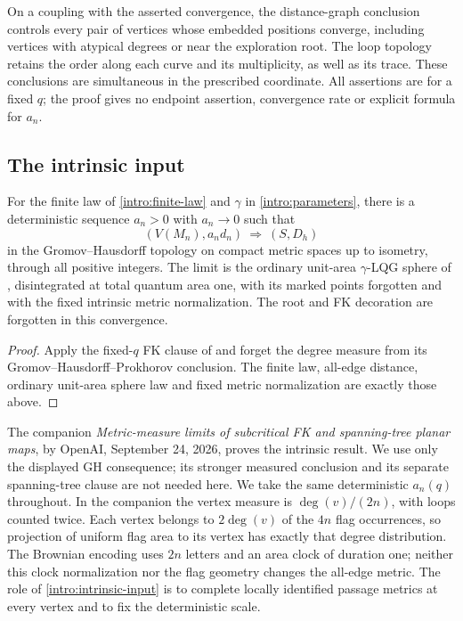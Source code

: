 On a coupling with the asserted convergence, the distance-graph conclusion
controls every pair of vertices whose embedded positions converge,
including vertices with atypical degrees
or near the exploration root. The loop topology retains the order along
each curve and its multiplicity, as well as its trace. These conclusions
are simultaneous in the prescribed coordinate. All assertions are for
a fixed $q$; the proof gives no endpoint assertion, convergence rate
or explicit formula for $a_n$.

\subsection{The intrinsic input}

\begin{theorem}
\label{intro:intrinsic-input}
For the finite law of \cref{intro:finite-law} and $\gamma$ in
\eqref{intro:parameters}, there is a deterministic sequence $a_n>0$
with $a_n\to0$ such that
\[
 (V(M_n),a_n d_n)\ \Longrightarrow\ (S,D_h)
\]
in the Gromov--Hausdorff topology on compact metric spaces up to
isometry, through all positive integers. The limit is the ordinary
unit-area $\gamma$-LQG sphere of \citet[Definition~4.21(ii)]{DMSMating},
disintegrated at total quantum area one, with its marked points
forgotten and with the fixed intrinsic metric normalization. The root
and FK decoration are forgotten in this convergence.
\end{theorem}

\begin{proof}
Apply the fixed-$q$ FK clause of \citet[Theorem~1.1]{Intrinsic-input} and
forget the degree measure from its Gromov--Hausdorff--Prokhorov conclusion.
The finite law, all-edge distance, ordinary unit-area sphere law and fixed
metric normalization are exactly those above.
\end{proof}

The companion \emph{Metric-measure limits of subcritical FK and
spanning-tree planar maps}, by OpenAI, September 24, 2026, proves the
intrinsic result. We use only the displayed GH consequence; its stronger
measured conclusion and its separate spanning-tree clause are not needed
here. We take the same deterministic
$a_n(q)$ throughout. In the companion the vertex measure is
$\deg(v)/(2n)$, with loops counted twice. Each vertex belongs to
$2\deg(v)$ of the $4n$ flag occurrences, so projection of uniform flag
area to its vertex has exactly that degree distribution. The Brownian
encoding uses $2n$ letters and an area clock of duration one; neither this
clock normalization nor the flag geometry changes the all-edge metric.
The role of \cref{intro:intrinsic-input} is to complete locally identified
passage metrics at every vertex and to fix the deterministic scale.

